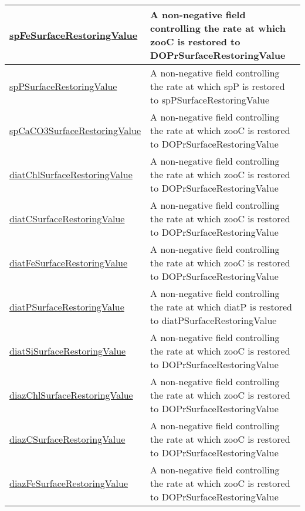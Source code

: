 {\begin{center}
\begin{longtable}{| p{2.0in} | p{4.0in} |}
    \hline
    \hyperref[subsec:var_sec_forcing_spFeSurfaceRestoringValue]{spFeSurfaceRestoringValue} & A non-negative field controlling the rate at which zooC is restored to DOPrSurfaceRestoringValue \\
    \hline
    \hyperref[subsec:var_sec_forcing_spPSurfaceRestoringValue]{spPSurfaceRestoringValue} & A non-negative field controlling the rate at which spP is restored to spPSurfaceRestoringValue \\
    \hline
    \hyperref[subsec:var_sec_forcing_spCaCO3SurfaceRestoringValue]{spCaCO3SurfaceRestoringValue} & A non-negative field controlling the rate at which zooC is restored to DOPrSurfaceRestoringValue \\
    \hline
    \hyperref[subsec:var_sec_forcing_diatChlSurfaceRestoringValue]{diatChlSurfaceRestoringValue} & A non-negative field controlling the rate at which zooC is restored to DOPrSurfaceRestoringValue \\
    \hline
    \hyperref[subsec:var_sec_forcing_diatCSurfaceRestoringValue]{diatCSurfaceRestoringValue} & A non-negative field controlling the rate at which zooC is restored to DOPrSurfaceRestoringValue \\
    \hline
    \hyperref[subsec:var_sec_forcing_diatFeSurfaceRestoringValue]{diatFeSurfaceRestoringValue} & A non-negative field controlling the rate at which zooC is restored to DOPrSurfaceRestoringValue \\
    \hline
    \hyperref[subsec:var_sec_forcing_diatPSurfaceRestoringValue]{diatPSurfaceRestoringValue} & A non-negative field controlling the rate at which diatP is restored to diatPSurfaceRestoringValue \\
    \hline
    \hyperref[subsec:var_sec_forcing_diatSiSurfaceRestoringValue]{diatSiSurfaceRestoringValue} & A non-negative field controlling the rate at which zooC is restored to DOPrSurfaceRestoringValue \\
    \hline
    \hyperref[subsec:var_sec_forcing_diazChlSurfaceRestoringValue]{diazChlSurfaceRestoringValue} & A non-negative field controlling the rate at which zooC is restored to DOPrSurfaceRestoringValue \\
    \hline
    \hyperref[subsec:var_sec_forcing_diazCSurfaceRestoringValue]{diazCSurfaceRestoringValue} & A non-negative field controlling the rate at which zooC is restored to DOPrSurfaceRestoringValue \\
    \hline
    \hyperref[subsec:var_sec_forcing_diazFeSurfaceRestoringValue]{diazFeSurfaceRestoringValue} & A non-negative field controlling the rate at which zooC is restored to DOPrSurfaceRestoringValue \\

\end{longtable}
\end{center}}
